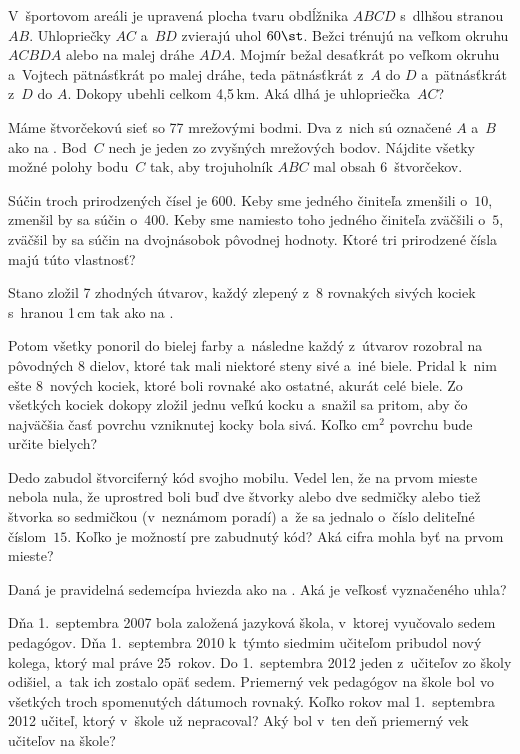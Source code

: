 {%
V~športovom areáli je upravená plocha tvaru obdĺžnika $ABCD$ s~dlhšou
stranou~$AB$.
Uhlopriečky $AC$ a~$BD$ zvierajú uhol $60\st$.
Bežci trénujú na veľkom okruhu $ACBDA$ alebo na malej dráhe $ADA$.
Mojmír bežal desaťkrát po veľkom okruhu a~Vojtech
pätnásťkrát po malej dráhe, teda pätnásťkrát z~$A$ do $D$ a~pätnásťkrát z~$D$ do $A$.
Dokopy ubehli celkom 4{,}5\,km.
Aká dlhá je uhlopriečka~$AC$?}

{%
Máme štvorčekovú sieť so 77 mrežovými bodmi. Dva z~nich sú označené
$A$ a~$B$ ako na \obr{}. Bod~$C$ nech je jeden zo zvyšných mrežových
bodov. Nájdite všetky možné polohy bodu~$C$ tak, aby trojuholník $ABC$ mal
obsah 6~štvorčekov.
%
}

{%
Súčin troch prirodzených čísel je $600$.
Keby sme jedného činiteľa zmenšili o~$10$, zmenšil by sa súčin o~$400$.
Keby sme namiesto toho jedného činiteľa zväčšili o~$5$, zväčšil by sa súčin na
dvojnásobok pôvodnej hodnoty.
Ktoré tri prirodzené čísla majú túto vlastnosť?}

{%
Stano zložil 7 zhodných útvarov, každý zlepený z~8 rovnakých sivých
kociek s~hranou 1\,cm tak ako na \obr{}.
%

\noindent
Potom všetky ponoril do bielej farby a~následne každý z~útvarov rozobral na
pôvodných 8 dielov, ktoré tak mali niektoré steny sivé a~iné biele.
Pridal k~nim ešte 8~nových kociek, ktoré boli rovnaké ako ostatné,
akurát celé biele. Zo všetkých kociek dokopy zložil jednu veľkú kocku a~snažil sa pritom, aby čo najväčšia časť povrchu vzniknutej kocky bola sivá.
Koľko cm$^2$ povrchu bude určite bielych?}

{%
Dedo zabudol štvorciferný kód svojho mobilu. Vedel len, že na prvom mieste
nebola nula, že uprostred boli buď dve štvorky alebo dve sedmičky alebo tiež štvorka
so sedmičkou (v~neznámom poradí)
a~že sa jednalo o~číslo deliteľné číslom~$15$.
Koľko je možností pre zabudnutý kód?
Aká cifra mohla byť na prvom mieste?}

{%
Daná je pravidelná sedemcípa hviezda ako na \obr{}. Aká je veľkosť vyznačeného uhla?
%
}

{%
Dňa 1.~septembra 2007 bola založená jazyková škola, v~ktorej vyučovalo sedem pedagógov.
Dňa 1.~septembra 2010 k~týmto siedmim učiteľom pribudol nový kolega, ktorý mal práve
25~rokov. Do 1.~septembra 2012 jeden z~učiteľov zo školy odišiel, a~tak ich zostalo
opäť sedem. Priemerný vek pedagógov na škole bol vo všetkých troch spomenutých dátumoch
rovnaký.
Koľko rokov mal 1.~septembra 2012 učiteľ, ktorý v~škole už nepracoval?
Aký bol v~ten deň priemerný vek učiteľov na škole?}

